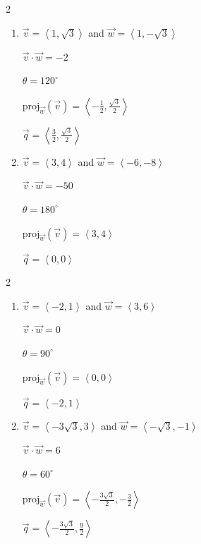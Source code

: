 \documentclass{ximera}
\begin{document}
\begin{multicols}{2} \raggedcolumns 
\begin{enumerate}
\setcounter{enumi}{\value{HW}}
\item $\overrightarrow{v} = \left\langle 1, \sqrt{3} \right\rangle$ and $\overrightarrow{w} = \left\langle 1, -\sqrt{3} \right\rangle$

 $\overrightarrow{v} \cdot \overrightarrow{w} = -2$

 $\theta =  120^{\circ}$ 

 $\text{proj}_{\overrightarrow{w}}(\overrightarrow{v}) = \left\langle -\frac{1}{2}, \frac{\sqrt{3}}{2} \right\rangle$

 $\overrightarrow{q} = \left\langle \frac{3}{2}, \frac{\sqrt{3}}{2} \right\rangle$
 
 \vfill
 
\item $\overrightarrow{v} = \left\langle 3,4 \right\rangle$ and $\overrightarrow{w} = \left\langle -6, -8 \right\rangle$

 $\overrightarrow{v} \cdot \overrightarrow{w} = -50$

 $\theta =  180^{\circ}$ 

 $\text{proj}_{\overrightarrow{w}}(\overrightarrow{v}) = \left\langle 3, 4 \right\rangle$

 $\overrightarrow{q} = \left\langle0, 0\right\rangle$ 

 
\setcounter{HW}{\value{enumi}}
\end{enumerate}
\end{multicols}
 
 \begin{multicols}{2} \raggedcolumns 
\begin{enumerate}
\setcounter{enumi}{\value{HW}}
\item $\overrightarrow{v} = \left\langle -2,1 \right\rangle$ and $\overrightarrow{w} = \left\langle 3,6 \right\rangle$

 $\overrightarrow{v} \cdot \overrightarrow{w} = 0$

 $\theta =  90^{\circ}$ 

 $\text{proj}_{\overrightarrow{w}}(\overrightarrow{v}) = \left\langle 0, 0 \right\rangle$

 $\overrightarrow{q} = \left\langle -2, 1 \right\rangle$
 
 \vfill
 
\item $\overrightarrow{v} = \left\langle -3\sqrt{3}, 3\right\rangle$ and $\overrightarrow{w} = \left\langle -\sqrt{3}, -1 \right\rangle$

 $\overrightarrow{v} \cdot \overrightarrow{w} = 6$

 $\theta =  60^{\circ}$ 

 $\text{proj}_{\overrightarrow{w}}(\overrightarrow{v}) = \left\langle -\frac{3\sqrt{3}}{2}, -\frac{3}{2} \right\rangle$

 $\overrightarrow{q} = \left\langle -\frac{3\sqrt{3}}{2}, \frac{9}{2} \right\rangle$ 

 
\setcounter{HW}{\value{enumi}}
\end{enumerate}
\end{multicols}
 
\end{document}
